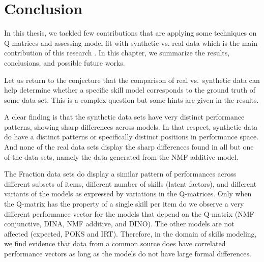 \label{sec:Conclusion}


\section{Conclusion}

In this thesis, we tackled few contributions that are applying some techniques on Q-matrices and assessing model fit with synthetic vs. real data which is the main contribution of this research . In this chapter, we summarize the results, conclusions, and possible future works.

Let us return to the conjecture that the comparison of real vs.\ synthetic data can help determine whether a specific skill model corresponds to the ground truth of some data set.  This is a complex question but some hints are given in the results.  

A clear finding is that the synthetic data sets have very distinct performance patterns, showing sharp differences across models.  In that respect, synthetic data do have a distinct patterns or specifically distinct positions in performance space.  And none of the real data sets display the sharp differences found in all but one of the data sets, namely the data generated from the NMF additive model.  

The Fraction data sets do display a similar pattern of performances across different subsets of items, different number of skills (latent factors), and different variants of the models as expressed by variations in the Q-matrices. Only when the Q-matrix has the property of a single skill per item do we observe a very different performance vector for the models that depend on the Q-matrix (NMF conjunctive, DINA, NMF additive, and DINO).  The other models are not affected (expected, POKS and IRT).  Therefore, in the domain of skills modeling, we find evidence that data from a common source does have correlated performance vectors as long as the models do not have large formal differences.


